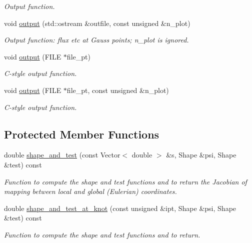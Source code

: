 \begin{DoxyCompactItemize}
\begin{DoxyCompactList}\small\item\em Output function. \end{DoxyCompactList}\item 
void \hyperlink{classoomph_1_1PMLHelmholtzFluxFromNormalDisplacementBCElement_af0317c3b22f661138ddc31968c67eed8}{output} (std\+::ostream \&outfile, const unsigned \&n\+\_\+plot)
\begin{DoxyCompactList}\small\item\em Output function\+: flux etc at Gauss points; n\+\_\+plot is ignored. \end{DoxyCompactList}\item 
void \hyperlink{classoomph_1_1PMLHelmholtzFluxFromNormalDisplacementBCElement_a357bf237c7b8a0d421851a6e8f93a9b6}{output} (F\+I\+LE $\ast$file\+\_\+pt)
\begin{DoxyCompactList}\small\item\em C-\/style output function. \end{DoxyCompactList}\item 
void \hyperlink{classoomph_1_1PMLHelmholtzFluxFromNormalDisplacementBCElement_a798feeb0c2f831476e3ded0a91c6a572}{output} (F\+I\+LE $\ast$file\+\_\+pt, const unsigned \&n\+\_\+plot)
\begin{DoxyCompactList}\small\item\em C-\/style output function. \end{DoxyCompactList}\end{DoxyCompactItemize}
\subsection*{Protected Member Functions}
\begin{DoxyCompactItemize}
\item 
double \hyperlink{classoomph_1_1PMLHelmholtzFluxFromNormalDisplacementBCElement_a4e6b686d2905fc642cb735d611830be4}{shape\+\_\+and\+\_\+test} (const Vector$<$ double $>$ \&s, Shape \&psi, Shape \&test) const
\begin{DoxyCompactList}\small\item\em Function to compute the shape and test functions and to return the Jacobian of mapping between local and global (Eulerian) coordinates. \end{DoxyCompactList}\item 
double \hyperlink{classoomph_1_1PMLHelmholtzFluxFromNormalDisplacementBCElement_ac0c13560b5e8dba19dc11f44f455bf97}{shape\+\_\+and\+\_\+test\+\_\+at\+\_\+knot} (const unsigned \&ipt, Shape \&psi, Shape \&test) const
\begin{DoxyCompactList}\small\item\em Function to compute the shape and test functions and to return. \end{DoxyCompactList}\end{DoxyCompactItemize}
